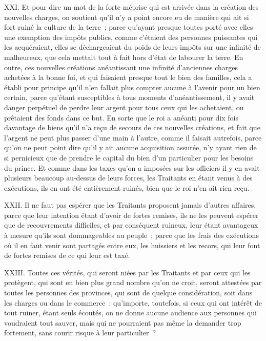 \documentclass[french,twoside]{book} %
\begin{document}
XXI. Et pour dire un mot de la forte méprise qui est arrivée dans la création des nouvelles charges, on soutient qu’il n’y a point encore eu de manière qui ait si fort ruiné la culture de la terre ; parce qu’ayant presque toutes porté avec elles une exemption des impôts publics, comme c’étaient des personnes puissantes qui les acquéraient, elles se déchargeaient du poids de leurs impôts sur une infinité de malheureux, que cela mettait tout à fait hors d’état de labourer la terre. En outre, ces nouvelles créations anéantissant une infinité d’anciennes charges achetées à la bonne foi, et qui faisaient presque tout le bien des familles, cela a établi pour principe qu’il n’en fallait plus compter aucune à l’avenir pour un bien certain, parce qu’étant susceptibles à tous moments d’anéantissement, il y avait danger perpétuel de perdre leur argent pour tous ceux qui les achetaient, ou prêtaient des fonds dans ce but. En sorte que le roi a anéanti pour dix fois davantage de biens qu’il n’a reçu de secours de ces nouvelles créations, et fait que l’argent ne peut plus passer d’une main à l’autre, comme il faisait autrefois, parce qu’on ne peut point dire qu’il y ait aucune acquisition assurée, n’y ayant rien de si pernicieux que de prendre le capital du bien d’un particulier pour les besoins du prince. Et comme dans les taxes qu’on a imposées sur les officiers il y en avait plusieurs beaucoup au-dessus de leurs forces, les Traitants en étant venus à des exécutions, ils en ont été entièrement ruinés, bien que le roi n’en ait rien reçu.\par
XXII. Il ne faut pas espérer que les Traitants proposent jamais d’autres affaires, parce que leur intention étant d’avoir de fortes remises, ils ne les peuvent espérer que de recouvrements difficiles, et par conséquent ruineux, leur étant avantageux à mesure qu’ils sont dommageables au peuple ; parce que les frais des exécutions où il en faut venir sont partagés entre eux, les huissiers et les recors, qui leur font de fortes remises de ce qui leur est taxé.\par
XXIII. Toutes ces vérités, qui seront niées par les Traitants et par ceux qui les protègent, qui sont en bien plus grand nombre qu’on ne croit, seront attestées par toutes les personnes des provinces, qui sont de quelque considération, soit dans les charges ou dans le commerce : qu’importe, toutefois, si ceux qui ont intérêt de tout ruiner, étant seuls écoutés, on ne donne aucune audience aux personnes qui voudraient tout sauver, mais qui ne pourraient pas même la demander trop fortement, sans courir risque à leur particulier ?\par
\end{document}

